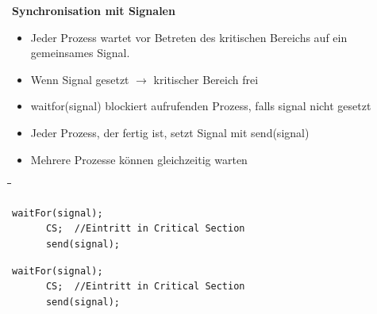 \vspace*{-1cm}
\textbf{Synchronisation mit Signalen}
\begin{itemize}
  \item Jeder Prozess wartet vor Betreten des kritischen Bereichs auf ein
  gemeinsames Signal. 
  \item Wenn Signal gesetzt $\rightarrow$ kritischer Bereich frei
  \item waitfor(signal) blockiert aufrufenden Prozess, falls signal nicht
  gesetzt
  \item Jeder Prozess, der fertig ist, setzt Signal mit send(signal)
  \item Mehrere Prozesse können gleichzeitig warten 
\end{itemize}

\begin{tabbing}
  \hspace*{1cm}\=\hspace*{4.2cm}\=\hspace*{3cm}\=\hspace*{2.7cm}\= \kill
   \> \> \\
  \>\begin{lstlisting}[style=C]
      waitFor(signal); 
      CS;  //Eintritt in Critical Section 
      send(signal); 
    \end{lstlisting} \> \> \>
    \begin{lstlisting}[style=C]
      waitFor(signal); 
      CS;  //Eintritt in Critical Section 
      send(signal); 
    \end{lstlisting} \\\\
 \end{tabbing}
 \vspace*{-1.5cm}
